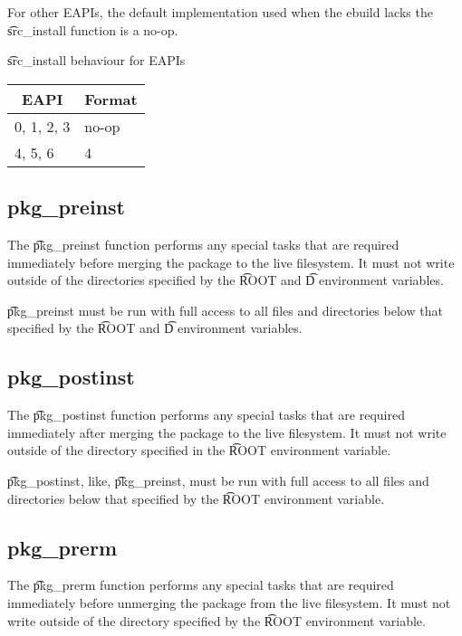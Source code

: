 For other EAPIs, the default implementation used when the ebuild lacks the \t{src\_install} function
is a no-op.

\begin{centertable}{\t{src\_install} behaviour for EAPIs}
    \label{tab:src-install-table}
    \begin{tabular}{ll}
      \toprule
      \multicolumn{1}{c}{\textbf{EAPI}} &
      \multicolumn{1}{c}{\textbf{Format}} \\
      \midrule
      0, 1, 2, 3        & no-op \\
      4, 5, 6           & 4     \\
      \bottomrule
    \end{tabular}
\end{centertable}

\subsection{pkg\_preinst}
\label{sec:pkg-preinst-function}

The \t{pkg\_preinst} function performs any special tasks that are required immediately before
merging the package to the live filesystem. It must not write outside of the directories specified
by the \t{ROOT} and \t{D} environment variables.

\t{pkg\_preinst} must be run with full access to all files and directories below that specified by
the \t{ROOT} and \t{D} environment variables.

\subsection{pkg\_postinst}
\label{sec:pkg-postinst-function}

The \t{pkg\_postinst} function performs any special tasks that are required immediately after
merging the package to the live filesystem. It must not write outside of the directory specified
in the \t{ROOT} environment variable.

\t{pkg\_postinst}, like, \t{pkg\_preinst}, must be run with full access to all files and directories
below that specified by the \t{ROOT} environment variable.

\subsection{pkg\_prerm}
\label{sec:pkg-prerm-function}

The \t{pkg\_prerm} function performs any special tasks that are required immediately before
unmerging the package from the live filesystem. It must not write outside of the directory specified
by the \t{ROOT} environment variable.

